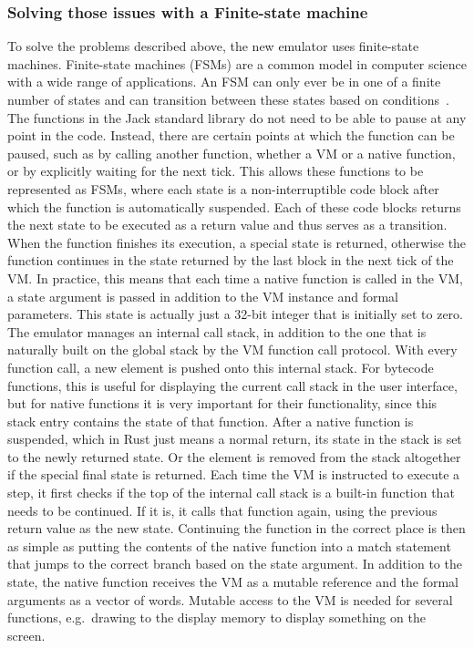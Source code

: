 
\subsubsection{Solving those issues with a Finite-state machine}
To solve the problems described above, the new emulator uses finite-state machines.
Finite-state machines (FSMs) are a common model in computer science with a wide range of applications.
An FSM can only ever be in one of a finite number of states and can transition between these states based on conditions~\cite{sakarovitch2009elements}.
The functions in the Jack standard library do not need to be able to pause at any point in the code.
Instead, there are certain points at which the function can be paused, such as by calling another function, whether a VM or a native function, or by explicitly waiting for the next tick.
This allows these functions to be represented as FSMs, where each state is a non-interruptible code block after which the function is automatically suspended.
Each of these code blocks returns the next state to be executed as a return value and thus serves as a transition.
When the function finishes its execution, a special state is returned, otherwise the function continues in the state returned by the last block in the next tick of the VM.
In practice, this means that each time a native function is called in the VM, a state argument is passed in addition to the VM instance and formal parameters.
This state is actually just a 32-bit integer that is initially set to zero.
The emulator manages an internal call stack, in addition to the one that is naturally built on the global stack by the VM function call protocol.
With every function call, a new element is pushed onto this internal stack.
For bytecode functions, this is useful for displaying the current call stack in the user interface, but for native functions it is very important for their functionality, since this stack entry contains the state of that function.
After a native function is suspended, which in Rust just means a normal return, its state in the stack is set to the newly returned state.
Or the element is removed from the stack altogether if the special final state is returned.
Each time the VM is instructed to execute a step, it first checks if the top of the internal call stack is a built-in function that needs to be continued.
If it is, it calls that function again, using the previous return value as the new state.
Continuing the function in the correct place is then as simple as putting the contents of the native function into a match statement that jumps to the correct branch based on the state argument.
In addition to the state, the native function receives the VM as a mutable reference and the formal arguments as a vector of words.
Mutable access to the VM is needed for several functions, e.g.\ drawing to the display memory to display something on the screen.

